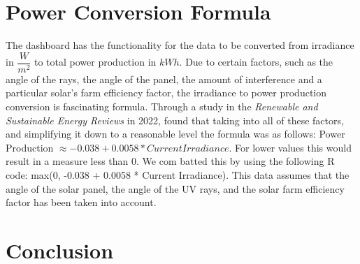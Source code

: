 \documentclass{sigchi}
\begin{document}
\section{Power Conversion Formula}
The dashboard has the functionality for the data to be converted from irradiance in $\dfrac{W}{m^2}$ to total power production in $kWh$. Due to certain factors, such as the angle of the rays, the angle of the panel, the amount of interference and a particular solar's farm efficiency factor, the irradiance to power production conversion is fascinating formula. Through a study in the \emph{Renewable and Sustainable Energy Reviews} in 2022\cite{PowerConversion}, found that taking into all of these factors, and simplifying it down to a reasonable level the formula was as follows: Power Production $\approx -0.038 + 0.0058 * Current Irradiance$. For lower values this would result in a measure less than 0. We com batted this by using the following R code: max(0, -0.038 + 0.0058 * Current Irradiance). This data assumes that the angle of the solar panel, the angle of the UV rays, and the solar farm efficiency factor has been taken into account. 




\section{Conclusion}
\end{document}
